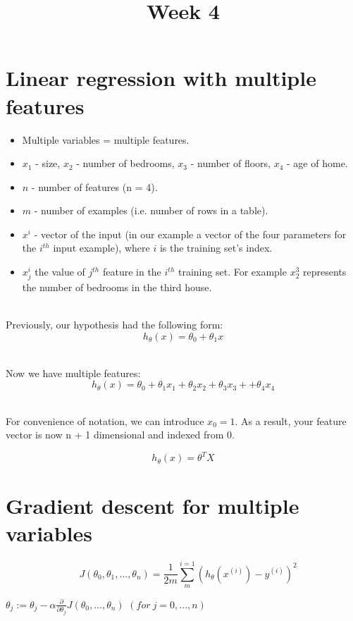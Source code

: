 \documentclass{article}
\title{Week 4}
\begin{document}
\maketitle
\newpage
{}

\section*{Linear regression with multiple features}
\begin{itemize}
  \item Multiple variables = multiple features.
  \item $x_1$ - size, $x_2$ - number of bedrooms, $x_3$ - number of floors, $x_4$ - age of home.
  \item $n$ - number of features (n = 4).
  \item $m$ - number of examples (i.e. number of rows in a table).
  \item $x^i$ - vector of the input (in our example a vector of the four parameters for the $i^{th}$ input example), where $i$ is the training set's index.
  \item $x_j^i$ the value of $j^{th}$ feature in the $i^{th}$ training set. For example $x_2^3$ represents the number of bedrooms in the third house.
\end{itemize}

~\\
Previously, our hypothesis had the following form:
$$h_{\theta}(x) = \theta_0 + \theta_1x$$

~\\
Now we have multiple features:
$$h_{\theta}(x) = \theta_0 + \theta_1x_1 + \theta_2x_2 + \theta_3x_3 + + \theta_4x_4$$

~\\
For convenience of notation, we can introduce $x_0 = 1$. As a result, your feature vector is now n + 1 dimensional and indexed from 0.

$$h_{\theta}(x) = \theta^T X$$

\section*{Gradient descent for multiple variables}

$$\quad J(\theta_0, \theta_1, ..., \theta_n) = \frac{1}{2m} \sum_{m}^{i=1}(h_{\theta}(x^{(i)}) - y^{(i)})^2$$

\begin{algorithm}
  \caption{Gradient Descent}\label{euclid}
  \begin{algorithmic}[1]
    \Large
    \State $\theta_j := \theta_j - \alpha \frac{\partial}{\partial \theta_j} J(\theta_0, ..., \theta_n)$
    \State $(for\ j = 0, ..., n)$
    \EndWhile
  \end{algorithmic}
\end{algorithm}
\end{document}
